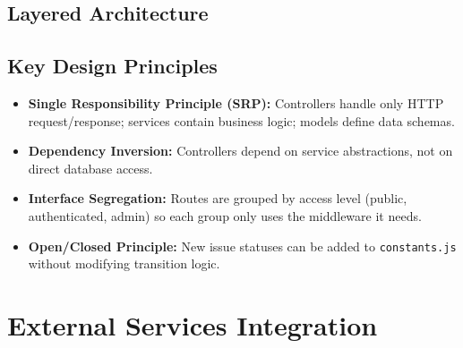 \documentclass[12pt,a4paper]{article}
\begin{document}
\subsection{Layered Architecture}
\begin{center}
\end{center}

\subsection{Key Design Principles}

\begin{itemize}[leftmargin=1.5cm]
  \item \textbf{Single Responsibility Principle (SRP):} Controllers handle only HTTP request/response; services contain business logic; models define data schemas.
  \item \textbf{Dependency Inversion:} Controllers depend on service abstractions, not on direct database access.
  \item \textbf{Interface Segregation:} Routes are grouped by access level (public, authenticated, admin) so each group only uses the middleware it needs.
  \item \textbf{Open/Closed Principle:} New issue statuses can be added to \texttt{constants.js} without modifying transition logic.
\end{itemize}

\section{External Services Integration}
\end{document}

